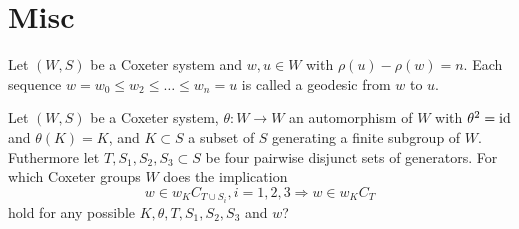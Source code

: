 \section{Misc}

\begin{defi}[Geodesic]
Let $(W,S)$ be a Coxeter system and $w,u \in W$ with $\rho(u) - \rho(w) = n$.
Each sequence $w = w_0 \leq w_2 \leq \ldots \leq w_n = u$ is called a geodesic
from $w$ to $u$.
\end{defi}

\begin{ques}
\label{main}
Let $(W,S)$ be a Coxeter system, $\theta : W \to W$ an automorphism of $W$ with
$\theta^2 = \operatorname{id}$ and $\theta(K) = K$, and $K \subset S$ a subset of $S$ generating
a finite subgroup of $W$. Futhermore let $T,S_1,S_2,S_3 \subset S$ be four pairwise
disjunct sets of generators. For which Coxeter groups $W$ does the implication
\begin{equation}
\label{main}
w \in w_K C_{T \cup S_i}, i=1,2,3 \Rightarrow w \in w_K C_T
\end{equation}
hold for any possible $K,\theta,T,S_1,S_2,S_3$ and $w$?
\end{ques}

